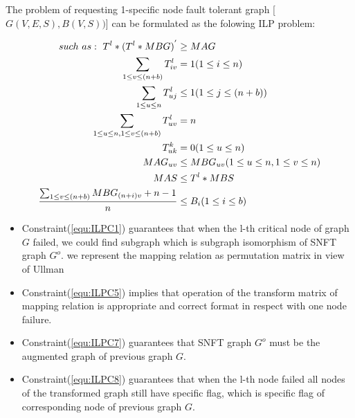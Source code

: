 The problem of requesting 1-specific node fault tolerant graph [$G(V,E,S),B(V,S))$] can be formulated as the folowing ILP problem:
\begin{center}
\begin{align}
\label{equ:ILPC1}such\ as:\ T^l*(T^l* MBG)^{'}&\geq MAG\\
\label{equ:ILPC2} \sum_{1\leq v\leq (n+b)}T^l_{iv}&= 1 (1\leq i\leq n)\\
\sum_{1\leq u\leq n}T^l_{uj}&\leq 1 (1\leq j\leq (n+b)) \notag \\
\sum_{1\leq u\leq n,1\leq v\leq (n+b)}T^l_{uv}&=n \notag\\
\label{equ:ILPC5}  T^k_{uk}&=0 (1\leq u\leq n)\\
\label{equ:ILPC7} MAG_{uv}&\leq MBG_{uv}(1\leq u\leq n,1\leq v\leq n)\\
\label{equ:ILPC8} MAS&\leq T^l*MBS\\
\label{equ:ILPC9} \frac{\sum_{1\leq v\leq (n+b)}MBG_{(n+i)v}+n-1}{n} &\leq B_i(1\leq i\leq b)\\
\end{align}

\end{center}

\begin{itemize}
\item Constraint(\ref{equ:ILPC1}) guarantees that when the l-th critical node of graph $G$ failed, we could find subgraph which is subgraph isomorphism of SNFT graph $G^o$. we represent the mapping relation as permutation matrix in view of Ullman\cite{ullmann1976algorithm}
\item Constraint(\ref{equ:ILPC5}) implies that operation of the transform matrix of mapping relation is appropriate and correct format in respect with one node failure.
\item Constraint(\ref{equ:ILPC7}) guarantees that SNFT graph $G^o$ must be the augmented graph of previous graph $G$.
\item Constraint(\ref{equ:ILPC8}) guarantees that when the l-th node failed  all nodes of the transformed graph still have specific flag, which is specific flag of corresponding node of previous graph $G$.

\end{itemize}
%
%

